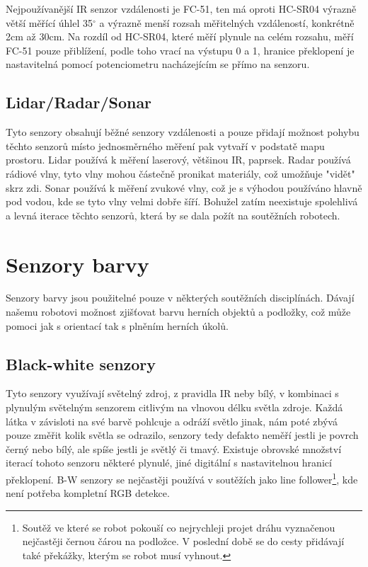 Nejpoužívanější IR senzor vzdálenosti je FC-51, ten má oproti HC-SR04 výrazně větší měřící úhlel 35$^{\circ}$ a výrazně menší rozsah měřitelných vzdáleností, konkrétně 2cm až 30cm.
Na rozdíl od HC-SR04, které měří plynule na celém rozsahu, měří FC-51 pouze přiblížení, podle toho vrací na výstupu 0 a 1, hranice překlopení je nastavitelná pomocí potenciometru nacházejícím se přímo na senzoru.

\subsection{Lidar/Radar/Sonar}
Tyto senzory obsahují běžné senzory vzdálenosti a pouze přidají možnost pohybu těchto senzorů místo jednosměrného měření pak vytvaří v podstatě mapu prostoru.
Lidar používá k měření laserový, většinou IR, paprsek.
Radar používá rádiové vlny, tyto vlny mohou částečně pronikat materiály, což umožňuje "vidět" skrz zdi.
Sonar používá k měření zvukové vlny, což je s výhodou používáno hlavně pod vodou, kde se tyto vlny velmi dobře šíří.
Bohužel zatím neexistuje spolehlivá a levná iterace těchto senzorů, která by se dala požít na soutěžních robotech.

\section{Senzory barvy}
Senzory barvy jsou použitelné pouze v některých soutěžních disciplínách.
Dávají našemu robotovi možnost zjišťovat barvu herních objektů a podložky, což může pomoci jak s orientací tak s plněním herních úkolů.

\subsection{Black-white senzory}
Tyto senzory využívají světelný zdroj, z pravidla IR neby bílý, v kombinaci s plynulým světelným senzorem citlivým na vlnovou délku světla zdroje.
Každá látka v závisloti na své barvě pohlcuje a odráží světlo jinak, nám poté zbývá pouze změřit kolik světla se odrazilo, senzory tedy defakto neměří jestli je povrch černý nebo bílý, ale spíše jestli je světlý či tmavý.
Existuje obrovské množství iterací tohoto senzoru některé plynulé, jiné digitální s nastavitelnou hranicí překlopení.
B-W senzory se nejčastěji používá v soutěžích jako line follower\footnote{Soutěž ve které se robot pokouší co nejrychleji projet dráhu vyznačenou nejčastěji černou čárou na podložce. V poslední době se do cesty přidávají také překážky, kterým se robot musí vyhnout.}, kde není potřeba kompletní RGB detekce.

